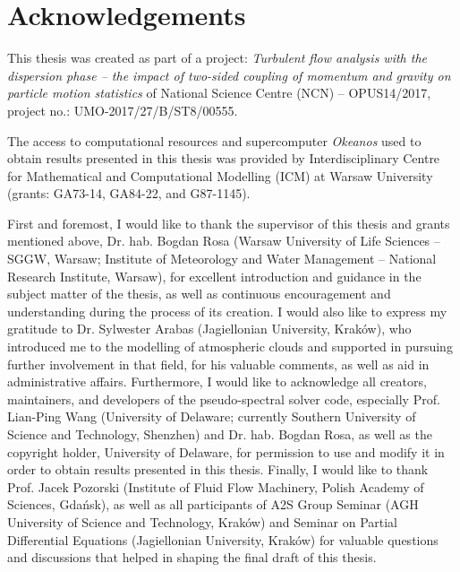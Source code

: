 \documentclass{pracamgren}
\begin{document}
\begin{abstract}
\end{abstract}


\tableofcontents


\chapter*{Acknowledgements}
\label{ch:ack}

This thesis was created as part of a project: \emph{Turbulent flow analysis with the dispersion phase -- the impact of two-sided coupling of momentum and gravity on particle motion statistics} of National Science Centre (NCN) -- OPUS14/2017, project no.: UMO-2017/27/B/ST8/00555.

The access to computational resources and supercomputer \emph{Okeanos} used to obtain results presented in this thesis was provided by Interdisciplinary Centre for Mathematical and Computational Modelling (ICM) at Warsaw University (grants: GA73-14, GA84-22, and G87-1145).

\medskip

First and foremost, I would like to thank the supervisor of this thesis and grants mentioned above, Dr. hab. Bogdan Rosa (Warsaw University of Life Sciences -- SGGW, Warsaw; Institute of Meteorology and Water Management -- National Research Institute, Warsaw), for excellent introduction and guidance in the subject matter of the thesis, as well as continuous encouragement and understanding during the process of its creation.
I would also like to express my gratitude to Dr. Sylwester Arabas (Jagiellonian University, Kraków), who introduced me to the modelling of atmospheric clouds and supported in pursuing further involvement in that field, for his valuable comments, as well as aid in administrative affairs.
Furthermore, I would like to acknowledge all creators, maintainers, and developers of the pseudo-spectral solver code, especially Prof. Lian-Ping Wang (University of Delaware; currently Southern University of Science and Technology, Shenzhen) and Dr. hab. Bogdan Rosa, as well as the copyright holder, University of Delaware, for permission to use and modify it in order to obtain results presented in this thesis.
Finally, I would like to thank Prof. Jacek Pozorski (Institute of Fluid Flow Machinery, Polish Academy of Sciences, Gdańsk), as well as all participants of A2S Group Seminar (AGH University of Science and Technology, Kraków) and Seminar on Partial Differential Equations (Jagiellonian University, Kraków) for valuable questions and discussions that helped in shaping the final draft of this thesis. 
\end{document}
